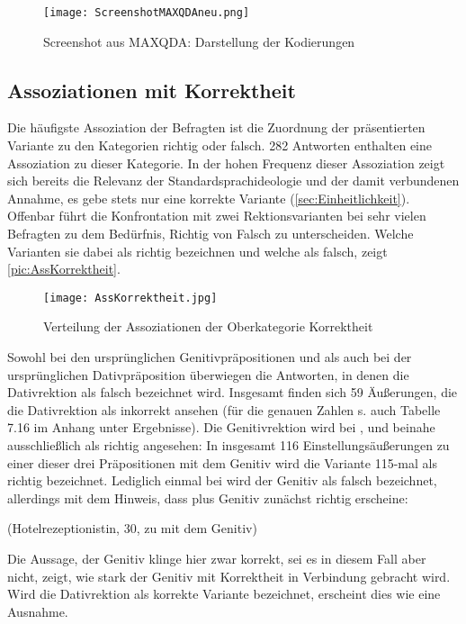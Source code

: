 \begin{figure}
\texttt{[image: ScreenshotMAXQDAneu.png]}
\caption{Screenshot aus MAXQDA: Darstellung der Kodierungen}
\label{pic:ScreenshotMAXQDA}
\end{figure}
\subsection{Assoziationen mit Korrektheit}
\label{sec:ErgAssKorrektheit}
Die häufigste Assoziation der Befragten ist die Zuordnung der präsentierten Variante zu den Kategorien \glqq richtig\grqq{} oder \glqq falsch\grqq. 
282 Antworten enthalten eine Assoziation zu dieser Kategorie. 
In der hohen Frequenz dieser Assoziation zeigt sich bereits die Relevanz der Standardsprachideologie und der damit verbundenen Annahme, es gebe stets nur eine korrekte Variante (\autoref{sec:Einheitlichkeit}). 
Offenbar führt die Konfrontation mit zwei Rektionsvarianten bei sehr vielen Befragten zu dem Bedürfnis, Richtig von Falsch zu unterscheiden. 
Welche Varianten sie dabei als richtig bezeichnen und welche als falsch, zeigt \autoref{pic:AssKorrektheit}. 

\begin{figure}
\texttt{[image: AssKorrektheit.jpg]}
\caption{Verteilung der Assoziationen der Oberkategorie \glqq Korrektheit\grqq}
\label{pic:AssKorrektheit}
\end{figure}
Sowohl bei den ursprünglichen Genitivpräpositionen \wegen{} und \waehrend{} als auch bei der ursprünglichen Dativpräposition \dank{} überwiegen die Antworten, in denen die Dativrektion als falsch bezeichnet wird. 
Insgesamt finden sich 59 Äußerungen, die die Dativrektion als inkorrekt ansehen (für die genauen Zahlen s. auch Tabelle 7.16 im Anhang unter Ergebnisse). 
Die Genitivrektion wird bei \wegen, \waehrend{} und \dank{} beinahe ausschließlich als richtig angesehen: 
In insgesamt 116 Einstellungsäußerungen zu einer dieser drei Präpositionen mit dem Genitiv wird die Variante 115-mal als richtig bezeichnet.
Lediglich einmal bei \dank{} wird der Genitiv als falsch bezeichnet, allerdings mit dem Hinweis, dass \dank{} plus Genitiv zunächst richtig erscheine: 
\begin{exe}
\ex {} (Hotelrezeptionistin, 30, zu \dank{} mit dem Genitiv)\label{Bsp:bemueht}
\end{exe}
Die Aussage, der Genitiv klinge hier zwar korrekt, sei es in diesem Fall aber nicht, zeigt, wie stark der Genitiv mit Korrektheit in Verbindung gebracht wird.
Wird die Dativrektion als korrekte Variante bezeichnet, erscheint dies wie eine Ausnahme. 

